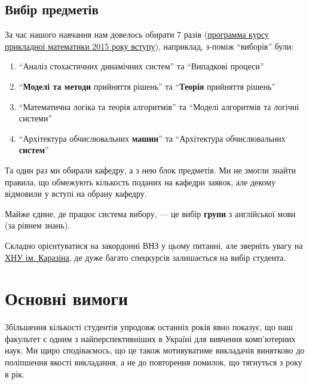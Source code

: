 \documentclass[14pt, a4paper]{extarticle}  %
\begin{document}
\subsection{Вибір предметів}
\label{real_choice}
За час нашого навчання нам довелось обирати 7 разів (\href{http://csc.knu.ua/media/filer_public/3b/e7/3be7da3c-5fc4-454e-b316-c55718de0d42/b6_040301_pm_2015.pdf}{программа курсу прикладної математики 2015 року вступу}), наприклад, з-поміж ``виборів'' були: %
\begin{enumerate}
    \item ``Аналіз стохастичних динамічних систем'' та ``Випадкові процеси''
    \item ``\textbf{Моделі та методи} прийняття рішень'' та ``\textbf{Теорія} прийняття рішень''
    \item  ``Математична логіка та теорія алгоритмів'' та ``Моделі алгоритмів та логічні системи''
    \item ``Архітектура обчислювальних \textbf{машин}'' та ``Архітектура обчислювальних \textbf{систем}''
\end{enumerate}

Та один раз ми обирали кафедру, а з нею блок предметів. Ми не змогли знайти правила, що обмежують кількость поданих на кафедри заявок, але декому відмовили у вступі на обрану кафедру. 

Майже єдине, де працює система вибору, --- це вибір \textbf{групи} з англійської мови (за рівнем знань). 

Складно орієнтуватися на закордонні ВНЗ у цьому питанні, але зверніть увагу на \href{http://appmath.univer.kharkov.ua/courses_new.html}{ХНУ ім. Каразіна}, де дуже багато спецкурсів залишається на вибір студента. 
\newpage

\section{Основні вимоги}
Збільшення кількості студентів упродовж останніх років явно показує, що наш факультет є одним з найперспективніших в Україні для вивчення комп'ютерних наук. Ми щиро сподіваємось, що це також мотивуватиме викладачів винятково до поліпшення якості викладання, а не до повторення помилок, що тягнуться з року в рік. 
\end{document}
